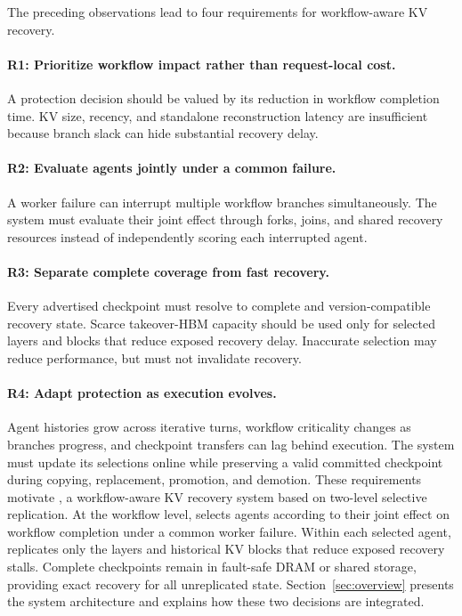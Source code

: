 The preceding observations lead to four requirements for workflow-aware KV recovery. \paragraph{R1: Prioritize workflow impact rather than request-local cost.} A protection decision should be valued by its reduction in workflow completion time. KV size, recency, and standalone reconstruction latency are insufficient because branch slack can hide substantial recovery delay. \paragraph{R2: Evaluate agents jointly under a common failure.} A worker failure can interrupt multiple workflow branches simultaneously. The system must evaluate their joint effect through forks, joins, and shared recovery resources instead of independently scoring each interrupted agent. \paragraph{R3: Separate complete coverage from fast recovery.} Every advertised checkpoint must resolve to complete and version-compatible recovery state. Scarce takeover-HBM capacity should be used only for selected layers and blocks that reduce exposed recovery delay. Inaccurate selection may reduce performance, but must not invalidate recovery. \paragraph{R4: Adapt protection as execution evolves.} Agent histories grow across iterative turns, workflow criticality changes as branches progress, and checkpoint transfers can lag behind execution. The system must update its selections online while preserving a valid committed checkpoint during copying, replacement, promotion, and demotion. These requirements motivate \system{}, a workflow-aware KV recovery system based on two-level selective replication. At the workflow level, \system{} selects agents according to their joint effect on workflow completion under a common worker failure. Within each selected agent, \system{} replicates only the layers and historical KV blocks that reduce exposed recovery stalls. Complete checkpoints remain in fault-safe DRAM or shared storage, providing exact recovery for all unreplicated state. Section~\ref{sec:overview} presents the system architecture and explains how these two decisions are integrated.


\fi
